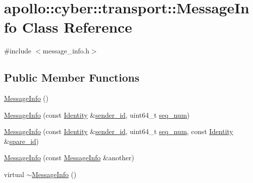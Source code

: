 \hypertarget{classapollo_1_1cyber_1_1transport_1_1MessageInfo}{\section{apollo\-:\-:cyber\-:\-:transport\-:\-:Message\-Info Class Reference}
\label{classapollo_1_1cyber_1_1transport_1_1MessageInfo}
}


{\ttfamily \#include $<$message\-\_\-info.\-h$>$}

\subsection*{Public Member Functions}
\begin{DoxyCompactItemize}
\item 
\hyperlink{classapollo_1_1cyber_1_1transport_1_1MessageInfo_a0875a4e3be0cc511282597c76d0446ce}{Message\-Info} ()
\item 
\hyperlink{classapollo_1_1cyber_1_1transport_1_1MessageInfo_a85ed297eb127e4974279b18161dfeef6}{Message\-Info} (const \hyperlink{classapollo_1_1cyber_1_1transport_1_1Identity}{Identity} \&\hyperlink{classapollo_1_1cyber_1_1transport_1_1MessageInfo_a7c61d9db0a53649e8ad7f65e91bc3815}{sender\-\_\-id}, uint64\-\_\-t \hyperlink{classapollo_1_1cyber_1_1transport_1_1MessageInfo_af0935046db714cc4eef7211e6acc8274}{seq\-\_\-num})
\item 
\hyperlink{classapollo_1_1cyber_1_1transport_1_1MessageInfo_a163d1c03b3520e853cf444196095d867}{Message\-Info} (const \hyperlink{classapollo_1_1cyber_1_1transport_1_1Identity}{Identity} \&\hyperlink{classapollo_1_1cyber_1_1transport_1_1MessageInfo_a7c61d9db0a53649e8ad7f65e91bc3815}{sender\-\_\-id}, uint64\-\_\-t \hyperlink{classapollo_1_1cyber_1_1transport_1_1MessageInfo_af0935046db714cc4eef7211e6acc8274}{seq\-\_\-num}, const \hyperlink{classapollo_1_1cyber_1_1transport_1_1Identity}{Identity} \&\hyperlink{classapollo_1_1cyber_1_1transport_1_1MessageInfo_a016351ea844d3192a46ec075b154aeb3}{spare\-\_\-id})
\item 
\hyperlink{classapollo_1_1cyber_1_1transport_1_1MessageInfo_a2e0f68952e424accd1fcedcfc0d909c4}{Message\-Info} (const \hyperlink{classapollo_1_1cyber_1_1transport_1_1MessageInfo}{Message\-Info} \&another)
\item 
virtual \hyperlink{classapollo_1_1cyber_1_1transport_1_1MessageInfo_ae146fc9f2cb5081ebefc6cb5afe816f7}{$\sim$\-Message\-Info} ()
\item 

\end{DoxyCompactItemize}
